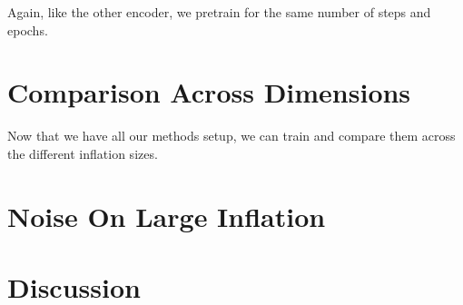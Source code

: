 
Again, like the other encoder, we pretrain for the same number of steps and epochs.

\section{Comparison Across Dimensions}

Now that we have all our methods setup, we can train and compare them across the different inflation sizes.

\section{Noise On Large Inflation}


\section{Discussion}